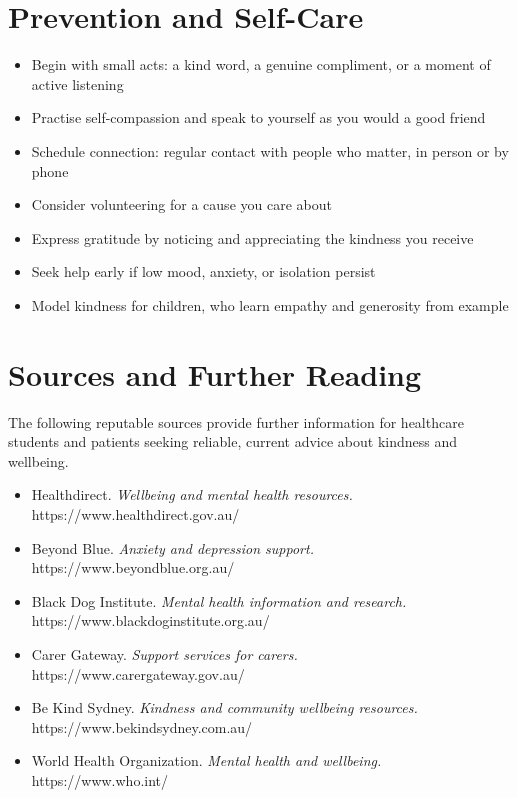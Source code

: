 \section*{Prevention and Self-Care}
\begin{itemize}
    \item Begin with small acts: a kind word, a genuine compliment, or a moment of active listening
    \item Practise self-compassion and speak to yourself as you would a good friend
    \item Schedule connection: regular contact with people who matter, in person or by phone
    \item Consider volunteering for a cause you care about
    \item Express gratitude by noticing and appreciating the kindness you receive
    \item Seek help early if low mood, anxiety, or isolation persist
    \item Model kindness for children, who learn empathy and generosity from example
\end{itemize}

\section*{Sources and Further Reading}
The following reputable sources provide further information for healthcare students and patients seeking reliable, current advice about kindness and wellbeing.
\begin{itemize}
    \item Healthdirect. \textit{Wellbeing and mental health resources.} https://www.healthdirect.gov.au/
    \item Beyond Blue. \textit{Anxiety and depression support.} https://www.beyondblue.org.au/
    \item Black Dog Institute. \textit{Mental health information and research.} https://www.blackdoginstitute.org.au/
    \item Carer Gateway. \textit{Support services for carers.} https://www.carergateway.gov.au/
    \item Be Kind Sydney. \textit{Kindness and community wellbeing resources.} https://www.bekindsydney.com.au/
    \item World Health Organization. \textit{Mental health and wellbeing.} https://www.who.int/
\end{itemize}
